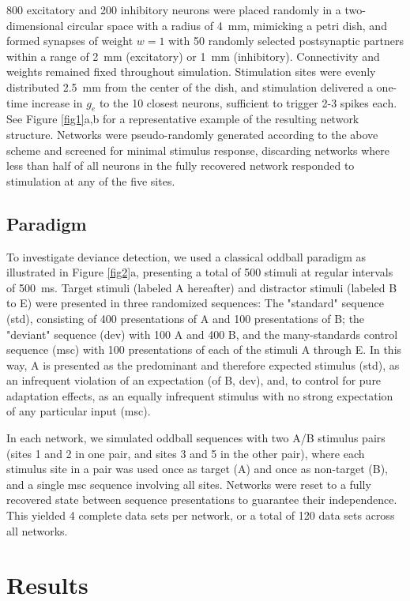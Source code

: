 \documentclass[pdflatex,referee,iicol,sn-basic]{sn-jnl}
\theoremstyle{thmstyleone}%
\theoremstyle{thmstyletwo}%
\theoremstyle{thmstylethree}%
\begin{document}
800 excitatory and 200 inhibitory neurons were placed randomly in a two-dimensional circular space with a radius of 4~mm, mimicking a petri dish, and formed synapses of weight $w=1$ with 50 randomly selected postsynaptic partners within a range of 2~mm (excitatory) or 1~mm (inhibitory). Connectivity and weights remained fixed throughout simulation. Stimulation sites were evenly distributed 2.5~mm from the center of the dish, and stimulation delivered a one-time increase in $g_e$ to the 10 closest neurons, sufficient to trigger 2-3 spikes each. See Figure \ref{fig1}a,b for a representative example of the resulting network structure. Networks were pseudo-randomly generated according to the above scheme and screened for minimal stimulus response, discarding networks where less than half of all neurons in the fully recovered network responded to stimulation at any of the five sites.

\subsection{Paradigm}\label{sec-paradigm}

To investigate deviance detection, we used a classical oddball paradigm as illustrated in Figure \ref{fig2}a, presenting a total of 500 stimuli at regular intervals of 500~ms. Target stimuli (labeled A hereafter) and distractor stimuli (labeled B to E) were presented in three randomized sequences: The "standard" sequence (std), consisting of 400 presentations of A and 100 presentations of B; the "deviant" sequence (dev) with 100 A and 400 B, and the many-standards control sequence (msc) with 100 presentations of each of the stimuli A through E. In this way, A is presented as the predominant and therefore expected stimulus (std), as an infrequent violation of an expectation (of B, dev), and, to control for pure adaptation effects, as an equally infrequent stimulus with no strong expectation of any particular input (msc).

In each network, we simulated oddball sequences with two A/B stimulus pairs (sites 1 and 2 in one pair, and sites 3 and 5 in the other pair), where each stimulus site in a pair was used once as target (A) and once as non-target (B), and a single msc sequence involving all sites. Networks were reset to a fully recovered state between sequence presentations to guarantee their independence. This yielded 4 complete data sets per network, or a total of 120 data sets across all networks.

\section{Results}\label{sec-results}
\end{document}
